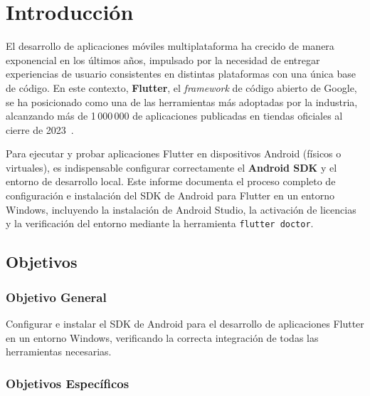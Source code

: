 \documentclass[12pt,a4paper]{article}
\begin{document}
\listoffigures


\newpage
{}
\setcounter{page}{1}

\section{Introducción}

El desarrollo de aplicaciones móviles multiplataforma ha crecido de manera exponencial en los últimos años, impulsado por la necesidad de entregar experiencias de usuario consistentes en distintas plataformas con una única base de código. En este contexto, \textbf{Flutter}, el \textit{framework} de código abierto de Google, se ha posicionado como una de las herramientas más adoptadas por la industria, alcanzando más de 1\,000\,000 de aplicaciones publicadas en tiendas oficiales al cierre de 2023~\cite{flutter2024}.

Para ejecutar y probar aplicaciones Flutter en dispositivos Android (físicos o virtuales), es indispensable configurar correctamente el \textbf{Android SDK} y el entorno de desarrollo local. Este informe documenta el proceso completo de configuración e instalación del SDK de Android para Flutter en un entorno Windows, incluyendo la instalación de Android Studio, la activación de licencias y la verificación del entorno mediante la herramienta \texttt{flutter doctor}.

\subsection{Objetivos}

\subsubsection{Objetivo General}

Configurar e instalar el SDK de Android para el desarrollo de aplicaciones Flutter en un entorno Windows, verificando la correcta integración de todas las herramientas necesarias.

\subsubsection{Objetivos Específicos}
\end{document}
